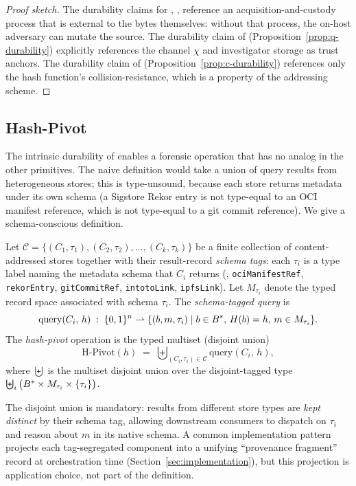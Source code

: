 \begin{proof}[Proof sketch]
The durability claims for , ,  reference an
acquisition-and-custody process that is external to the bytes themselves:
without that process, the on-host adversary can mutate the source. The
durability claim of  (Proposition~\ref{prop:q-durability}) explicitly
references the channel $\chi$ and investigator storage as trust anchors.
The durability claim of  (Proposition~\ref{prop:c-durability})
references only the hash function's collision-resistance, which is a
property of the addressing scheme. \qedhere
\end{proof}

\subsection{Hash-Pivot}

The intrinsic durability of  enables a forensic operation that has
no analog in the other primitives. The naive definition would take a union
of query results from heterogeneous stores; this is type-unsound, because
each store returns metadata under its own schema (a Sigstore Rekor entry
is not type-equal to an OCI manifest reference, which is not type-equal to
a git commit reference). We give a schema-conscious definition.

\begin{definition}
\label{def:hash-pivot}
Let $\mathcal{C} = \{(C_1, \tau_1), (C_2, \tau_2), \ldots, (C_k, \tau_k)\}$
be a finite collection of content-addressed stores together with their
result-record \emph{schema tags}: each $\tau_i$ is a type label naming the
metadata schema that $C_i$ returns (\eg{},
\texttt{ociManifestRef}, \texttt{rekorEntry}, \texttt{gitCommitRef},
\texttt{intotoLink}, \texttt{ipfsLink}). Let $M_{\tau_i}$ denote the typed
record space associated with schema $\tau_i$. The
\emph{schema-tagged query} is
\[
\mathrm{query}(C_i,\,h) \;:\; \{0,1\}^{n} \rightharpoonup \{(b, m, \tau_i)
\mid b \in B^{*},\, H(b) = h,\, m \in M_{\tau_i}\}.
\]
The \emph{hash-pivot} operation is the typed multiset (disjoint union)
\[
\mathrm{H\text{-}Pivot}(h)\;=\;\biguplus_{(C_i,\tau_i) \in \mathcal{C}}
\mathrm{query}(C_i,\,h),
\]
where $\biguplus$ is the multiset disjoint union over the disjoint-tagged
type $\biguplus_i \big(B^{*} \times M_{\tau_i} \times \{\tau_i\}\big)$.
\end{definition}

The disjoint union is mandatory: results from different store types are
\emph{kept distinct} by their schema tag, allowing downstream consumers to
dispatch on $\tau_i$ and reason about $m$ in its native schema. A common
implementation pattern projects each tag-segregated component into a
unifying ``provenance fragment'' record at orchestration time
(Section~\ref{sec:implementation}), but this projection is application
choice, not part of the definition.

